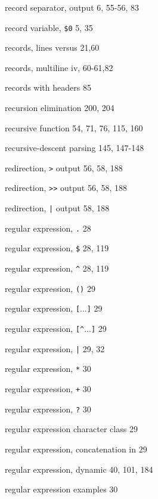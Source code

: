 \begin{multicols}{3}
\hangindent=3pc  record separator, output 6, 55-56, 83

\hangindent=3pc  record variable, \verb'$0' 5, 35

\hangindent=3pc  records, lines versus 21,60

\hangindent=3pc  records, multiline iv, 60-61,82

\hangindent=3pc  records with headers 85

\hangindent=3pc  recursion elimination 200, 204

\hangindent=3pc  recursive function 54, 71, 76, 115, 160

\hangindent=3pc  recursive-descent parsing 145, 147-148

\hangindent=3pc  redirection, \verb'>' output 56, 58, 188

\hangindent=3pc  redirection, \verb'>>' output 56, 58, 188

\hangindent=3pc  redirection, \verb'|' output 58, 188

\hangindent=3pc  regular expression, \verb'.' 28

\hangindent=3pc  regular expression, \verb'$' 28, 119

\hangindent=3pc  regular expression, \verb'^' 28, 119

\hangindent=3pc  regular expression, \verb'()' 29

\hangindent=3pc  regular expression, \verb'['...\verb']' 29

\hangindent=3pc  regular expression, \verb'[^'...\verb']' 29

\hangindent=3pc  regular expression, \verb'|' 29, 32

\hangindent=3pc  regular expression, \verb'*' 30

\hangindent=3pc  regular expression, \verb'+' 30

\hangindent=3pc  regular expression, \verb'?' 30

\hangindent=3pc  regular expression character class 29

\hangindent=3pc  regular expression, concatenation in 29

\hangindent=3pc  regular expression, dynamic 40, 101, 184

\hangindent=3pc  regular expression examples 30


\end{multicols}
